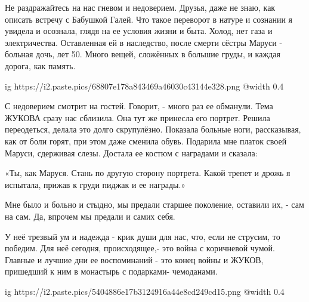 \begin{multicols}{2}
Не раздражайтесь на нас гневом и недоверием.
Друзья, даже не знаю, как описать встречу с Бабушкой Галей.
Что такое переворот  в натуре и сознании я увидела и осознала, 
глядя на ее условия жизни и быта. Холод, нет газа и электричества. 
Оставленная ей в наследство, после смерти сёстры Маруси
 - больная дочь, лет 50.
Много вещей, сложённых в большие груды, 
и каждая дорога, как память.

\ifcmt
  ig https://i2.paste.pics/68807e178a843469a46030c43144e328.png
  @width 0.4
\fi

С недоверием смотрит на гостей. Говорит, - много раз ее обманули.  Тема ЖУКОВА
сразу нас сблизила. Она тут же принесла его портрет. Решила переодеться, делала
это долго скрупулёзно.  Показала больные ноги,  рассказывая, как от боли горят,
при этом даже сменила обувь.  Подарила мне платок своей  Маруси, сдерживая
слезы.  Достала ее костюм с наградами и сказала: 

«Ты, как Маруся. Стань по другую сторону портрета.  Какой трепет и дрожь я
испытала, прижав к груди  пиджак и ее награды.»

Мне было и больно и стыдно, мы предали старшее поколение, оставили их, - сам на
сам.  Да, впрочем мы предали и самих себя. 

У неё трезвый ум и надежда - крик души  для нас, что, если не струсим, то
победим.  Для неё сегодня, происходящее,- это война с коричневой чумой.
Главные и лучшие дни  ее воспоминаний - это конец войны и ЖУКОВ, пришедший к
ним в монастырь с подарками- чемоданами. 

\ifcmt
  ig https://i2.paste.pics/5404886e17b3124916a44e8cd249cd15.png
  @width 0.4
\fi


\end{multicols}
